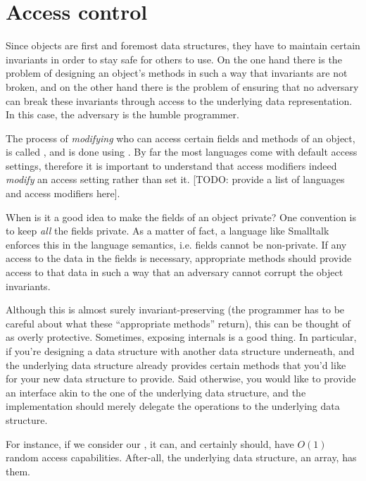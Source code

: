 \section{Access control}\label{section:objects:encapsulation}


Since objects are first and foremost data structures, they have to maintain
certain invariants in order to stay safe for others to use. On the one hand
there is the problem of designing an object's methods in such a way that
invariants are not broken, and on the other hand there is the problem of
ensuring that no adversary can break these invariants through access to the
underlying data representation. In this case, the adversary is the humble
programmer.

The process of \emph{modifying} who can access certain fields and methods of an
object, is called , and is done using . By far the most languages come with default access settings,
therefore it is important to understand that access modifiers indeed
\emph{modify} an access setting rather than set it. [TODO: provide a list of
languages and access modifiers here].

When is it a good idea to make the fields of an object private? One convention
is to keep \emph{all} the fields private. As a matter of fact, a language like
Smalltalk enforces this in the language semantics, i.e. fields cannot be
non-private. If any access to the data in the fields is necessary, appropriate
methods should provide access to that data in such a way that an adversary
cannot corrupt the object invariants.

Although this is almost surely invariant-preserving (the programmer has to be
careful about what these ``appropriate methods'' return), this can be thought
of as overly protective. Sometimes, exposing internals is a good thing. In
particular, if you're designing a data structure with another data structure
underneath, and the underlying data structure already provides certain methods
that you'd like for your new data structure to provide. Said otherwise, you
would like to provide an interface akin to the one of the underlying data
structure, and the implementation should merely delegate the operations to the
underlying data structure.

For instance, if we consider our , it can, and certainly
should, have $O(1)$ random access capabilities. After-all, the underlying data
structure, an array, has them.

